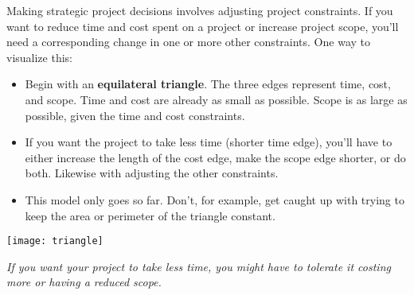 Making strategic project decisions involves adjusting project constraints. If you want to reduce time and cost spent on a project or increase project scope, you'll need a corresponding change in one or more other constraints. One way to visualize this:
\begin{itemize}
    \item Begin with an \textbf{equilateral triangle}. The three edges represent time, cost, and scope. Time and cost are already as small as possible. Scope is as large as possible, given the time and cost constraints.
    \item If you want the project to take less time (shorter time edge), you'll have to either increase the length of the cost edge, make the scope edge shorter, or do both. Likewise with adjusting the other constraints.
    \item This model only goes so far. Don't, for example, get caught up with trying to keep the area or perimeter of the triangle constant.
\end{itemize}

\begin{center}
\texttt{[image: triangle]}
\end{center}

\textit{If you want your project to take less time, you might have to tolerate it costing more or having a reduced scope.}

